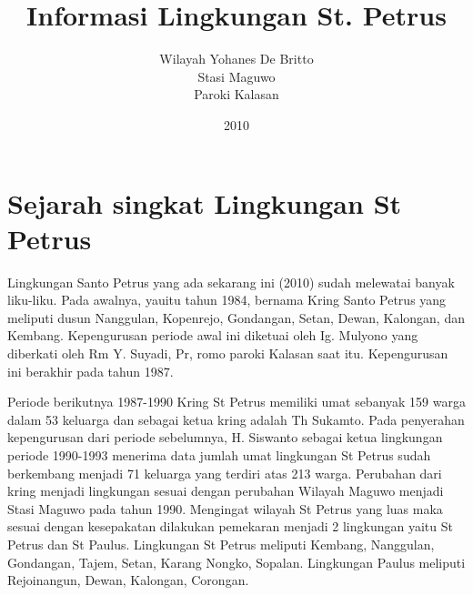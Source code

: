 \documentclass[a5paper,titlepage,11pt]{book}
\title{Informasi Lingkungan St. Petrus}
\author{Wilayah Yohanes De Britto \\Stasi Maguwo \\Paroki Kalasan}
\date{2010}
\begin{document}
\thispagestyle{empty}


\setlength{\parskip}{2mm}
\section*{Sejarah singkat Lingkungan St Petrus}
Lingkungan Santo Petrus yang ada sekarang ini (2010) sudah melewatai banyak liku-liku. Pada awalnya, yauitu tahun 1984, bernama Kring Santo Petrus yang meliputi dusun Nanggulan, Kopenrejo, Gondangan, Setan, Dewan, Kalongan,  dan Kembang. Kepengurusan periode awal ini diketuai oleh Ig. Mulyono yang diberkati oleh Rm Y. Suyadi, Pr, romo paroki Kalasan saat itu. Kepengurusan ini berakhir pada tahun 1987.

Periode berikutnya 1987-1990 Kring St Petrus memiliki umat sebanyak 159 warga dalam 53 keluarga dan sebagai ketua kring adalah Th Sukamto. 
Pada penyerahan kepengurusan dari periode sebelumnya, H. Siswanto sebagai ketua lingkungan periode 1990-1993 menerima data jumlah umat lingkungan St Petrus sudah berkembang menjadi 71 keluarga yang terdiri atas 213 warga. Perubahan dari kring menjadi lingkungan sesuai dengan perubahan Wilayah Maguwo menjadi Stasi Maguwo pada tahun 1990. 
Mengingat wilayah St Petrus yang luas maka sesuai dengan kesepakatan dilakukan pemekaran menjadi 2 lingkungan yaitu St Petrus dan St Paulus. Lingkungan St Petrus meliputi Kembang, Nanggulan, Gondangan, Tajem, Setan, Karang Nongko, Sopalan. Lingkungan Paulus meliputi Rejoinangun, Dewan, Kalongan, Corongan.
\end{document}
